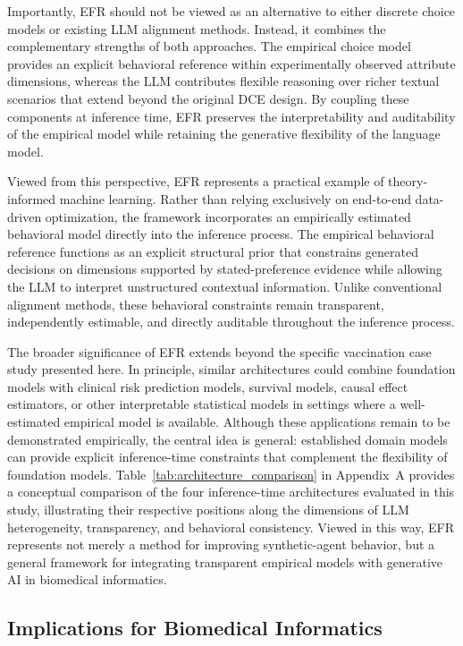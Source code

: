 \documentclass[11pt]{article}
\begin{document}
Importantly, EFR should not be viewed as an alternative to either discrete choice models or existing LLM alignment methods. Instead, it combines the complementary strengths of both approaches. The empirical choice model provides an explicit behavioral reference within experimentally observed attribute dimensions, whereas the LLM contributes flexible reasoning over richer textual scenarios that extend beyond the original DCE design. By coupling these components at inference time, EFR preserves the interpretability and auditability of the empirical model while retaining the generative flexibility of the language model.

Viewed from this perspective, EFR represents a practical example of theory-informed machine learning. Rather than relying exclusively on end-to-end data-driven optimization, the framework incorporates an empirically estimated behavioral model directly into the inference process. The empirical behavioral reference functions as an explicit structural prior that constrains generated decisions on dimensions supported by stated-preference evidence while allowing the LLM to interpret unstructured contextual information. Unlike conventional alignment methods, these behavioral constraints remain transparent, independently estimable, and directly auditable throughout the inference process.

The broader significance of EFR extends beyond the specific vaccination case study presented here. In principle, similar architectures could combine foundation models with clinical risk prediction models, survival models, causal effect estimators, or other interpretable statistical models in settings where a well-estimated empirical model is available. Although these applications remain to be demonstrated empirically, the central idea is general: established domain models can provide explicit inference-time constraints that complement the flexibility of foundation models. Table~\ref{tab:architecture_comparison} in Appendix~A provides a conceptual comparison of the four inference-time architectures evaluated in this study, illustrating their respective positions along the dimensions of LLM heterogeneity, transparency, and behavioral consistency. Viewed in this way, EFR represents not merely a method for improving synthetic-agent behavior, but a general framework for integrating transparent empirical models with generative AI in biomedical informatics.

\subsection{Implications for Biomedical Informatics}
\end{document}
